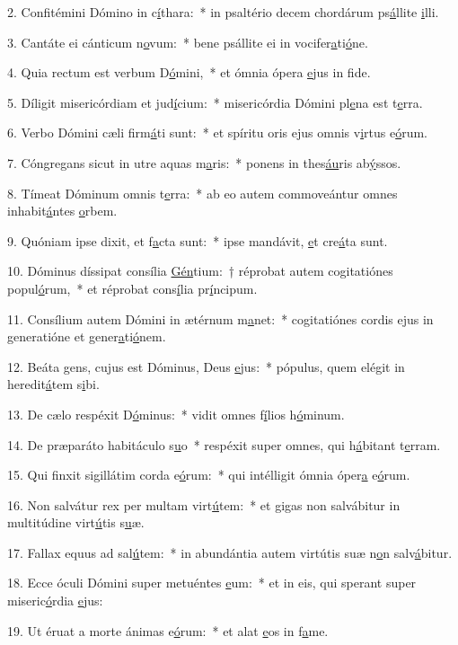 2. Confitémini Dómino in c\uline{í}thara:~* in psaltério decem chordárum ps\uline{á}llite \uline{i}lli.\par 
3. Cantáte ei cánticum n\uline{o}vum:~* bene psállite ei in vocifer\uline{a}ti\uline{ó}ne.\par 
4. Quia rectum est verbum D\uline{ó}mini,~* et ómnia ópera \uline{e}jus in f\uline{i}de.\par 
5. Díligit misericórdiam et jud\uline{í}cium:~* misericórdia Dómini pl\uline{e}na est t\uline{e}rra.\par 
6. Verbo Dómini cæli firm\uline{á}ti sunt:~* et spíritu oris ejus omnis v\uline{i}rtus e\uline{ó}rum.\par 
7. Cóngregans sicut in utre aquas m\uline{a}ris:~* ponens in thes\uline{áu}ris ab\uline{ý}ssos.\par 
8. Tímeat Dóminum omnis t\uline{e}rra:~* ab eo autem commoveántur omnes inhabit\uline{á}ntes \uline{o}rbem.\par 
9. Quóniam ipse dixit, et f\uline{a}cta sunt:~* ipse mandávit, \uline{e}t cre\uline{á}ta sunt.\par 
10. Dóminus díssipat consília \uline{Gén}tium:~† réprobat autem cogitatiónes popul\uline{ó}rum,~* et réprobat cons\uline{í}lia pr\uline{í}ncipum.\par 
11. Consílium autem Dómini in ætérnum m\uline{a}net:~* cogitatiónes cordis ejus in generatióne et gener\uline{a}ti\uline{ó}nem.\par 
12. Beáta gens, cujus est Dóminus, Deus \uline{e}jus:~* pópulus, quem elégit in heredit\uline{á}tem s\uline{i}bi.\par 
13. De cælo respéxit D\uline{ó}minus:~* vidit omnes f\uline{í}lios h\uline{ó}minum.\par 
14. De præparáto habitáculo s\uline{u}o~* respéxit super omnes, qui h\uline{á}bitant t\uline{e}rram.\par 
15. Qui finxit sigillátim corda e\uline{ó}rum:~* qui intélligit ómnia óper\uline{a} e\uline{ó}rum.\par 
16. Non salvátur rex per multam virt\uline{ú}tem:~* et gigas non salvábitur in multitúdine virt\uline{ú}tis s\uline{u}æ.\par 
17. Fallax equus ad sal\uline{ú}tem:~* in abundántia autem virtútis suæ n\uline{o}n salv\uline{á}bitur.\par 
18. Ecce óculi Dómini super metuéntes \uline{e}um:~* et in eis, qui sperant super miseric\uline{ó}rdia \uline{e}jus:\par 
19. Ut éruat a morte ánimas e\uline{ó}rum:~* et alat \uline{e}os in f\uline{a}me.\par 
